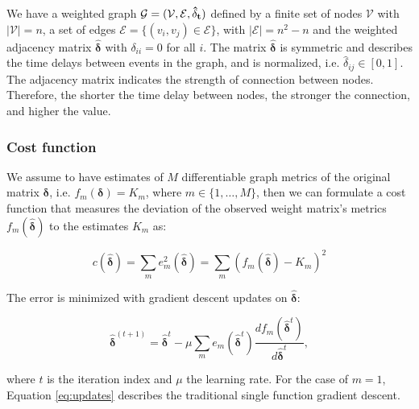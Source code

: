 \documentclass[12pt,a4paper,english]{article}
\begin{document}
We have a weighted graph $\mathcal{G} = (\mathcal{V}, \mathcal{E}, \bf{\hat{\delta}}_t)$ defined by a finite set of nodes $\mathcal{V}$ with $|\mathcal{V}| = n$, a set of edges $\mathcal{E} = \{ (v_i,v_j) \in \mathcal{E} \}$, with $|\mathcal{E}| = n^2-n$ and the weighted adjacency matrix $\bm{\hat{\delta}}$ with $\delta_{ii} = 0$ for all $i$. The matrix $\bm{\hat{\delta}}$  is symmetric and describes the time delays between events in the graph, and is normalized, i.e. $\hat{\delta}_{ij}\in [0,1]$. The adjacency matrix indicates the strength of connection between nodes. Therefore, the shorter the time delay between nodes, the stronger the connection, and higher the value. 

\subsubsection{Cost function}
We assume to have estimates of $M$ differentiable graph metrics of the original matrix $\bm{\delta}$, i.e. $f_m(\bm{\delta}) = K_m$, where $m\in\{ 1,\dots, M \}$, then we can formulate a cost function that measures the deviation of the observed weight matrix's metrics $f_m(\bm{\hat{\delta}})$ to the estimates $K_m$ as: 

\begin{equation}
c(\bm{\hat{\delta}}) = \sum_m e_m^2(\bm{\hat{\delta}}) = \sum_m(f_m(\bm{\hat{\delta}})-K_m)^2
\end{equation}

The error is minimized with gradient descent updates on $\bm{\hat{\delta}}$: 

\begin{equation}
\bm{\hat{\delta}}^{(t+1)} = \bm{\hat{\delta}}^t-\mu\sum_m e_m(\bm{\hat{\delta}}^t)\frac{df_m(\bm{\hat{\delta}}^t)}{d\bm{\hat{\delta}}^t},
\label{eq:updates}
\end{equation}

where $t$ is the iteration index and $\mu$ the learning rate. For the case of $m=1$, Equation \ref{eq:updates} describes the traditional single function gradient descent. 
\end{document}
